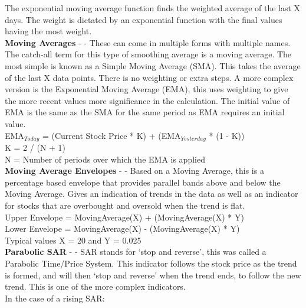 \documentclass[conference]{IEEEtran}
\begin{document}
The exponential moving average function finds the weighted average of the last X days. The weight is dictated by an exponential function with the final values having the most weight.\\

\noindent
\textbf{Moving Averages} - \cite{Murphy1999} - These can come in multiple forms with multiple names. The catch-all term for this type of smoothing average is a moving average. The most simple is known as a Simple Moving Average (SMA). This takes the average of the last X data points. There is no weighting or extra steps. A more complex version is the Exponential Moving Average (EMA), this uses weighting to give the more recent values more significance in the calculation. The initial value of EMA is the same as the SMA for the same period as EMA requires an initial value.\\

\noindent
EMA$_{Today}$ = (Current Stock Price * K) + (EMA$_{Yesterday}$ * (1 - K)) \\
K = 2 / (N + 1) \\
N = Number of periods over which the EMA is applied \\

\noindent
\textbf{Moving Average Envelopes} - \cite{Murphy1999} - Based on a Moving Average, this is a percentage based envelope that provides parallel bands above and below the Moving Average. Gives an indication of trends in the data as well as an indicator for stocks that are overbought and oversold when the trend is flat.\\

\noindent
Upper Envelope = MovingAverage(X) + (MovingAverage(X) * Y)\\
Lower Envelope = MovingAverage(X) - (MovingAverage(X) * Y)\\
Typical values X = 20 and Y = 0.025\\

\noindent
\textbf{Parabolic SAR} - \cite{Wilder1978} - SAR stands for `stop and reverse', this was called a Parabolic Time/Price System. This indicator follows the stock price as the trend is formed, and will then `stop and reverse' when the trend ends, to follow the new trend. This is one of the more complex indicators.\\

\noindent
In the case of a rising SAR:
\end{document}
